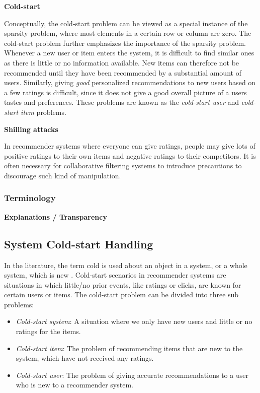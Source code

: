 \textbf{Cold-start}

Conceptually, the cold-start problem can be viewed as a special instance of the sparsity problem, where most elements in a certain row or column are zero. The cold-start problem further emphasizes the importance of the sparsity problem. Whenever a new user or item enters the system, it is difficult to find similar ones as there is little or no information available. New items can therefore not be recommended until they have been recommended by a substantial amount of users. Similarly, giving \emph{good} personalized recommendations to new users based on a few ratings is difficult, since it does not give a good overall picture of a users tastes and preferences. These problems are known as the \emph{cold-start user} and \emph{cold-start item} problems.

\textbf{Shilling attacks}

In recommender systems where everyone can give ratings, people may give lots of positive ratings to their own items and negative ratings to their competitors. It is often necessary for collaborative filtering systems to introduce precautions to discourage such kind of manipulation.

\subsubsection{Terminology}

\textbf{Explanations / Transparency}


\subsection{System Cold-start Handling}


In the literature, the term cold is used about an object in a system, or a
whole system, which is new \cite{Schein2002, Park2006}. Cold-start scenarios in recommender systems are
situations in which little/no prior events, like ratings or clicks, are known
for certain users or items. The cold-start problem can be divided into three sub problems:

\begin{itemize}
  \item \emph{Cold-start system}: A situation where we only have new users and
  little or no ratings for the items.

  \item \emph{Cold-start item}: The problem of recommending items that are new
  to the system, which have not received any ratings.

  \item \emph{Cold-start user}: The problem of giving accurate recommendations
  to a user who is new to a recommender system.
\end{itemize}

